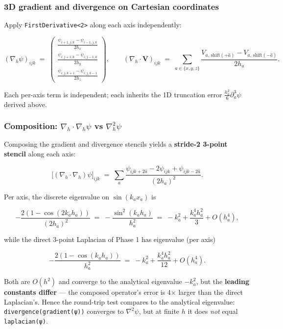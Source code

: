 \subsubsection{3D gradient and divergence on Cartesian
coordinates}\label{d-gradient-and-divergence-on-cartesian-coordinates}

Apply \passthrough{\lstinline!FirstDerivative<2>!} along each axis
independently:

\[
(\nabla_h \psi)_{ijk} \;=\; \begin{pmatrix}
\frac{\psi_{i+1, j, k} - \psi_{i-1, j, k}}{2 h_x} \\[4pt]
\frac{\psi_{i, j+1, k} - \psi_{i, j-1, k}}{2 h_y} \\[4pt]
\frac{\psi_{i, j, k+1} - \psi_{i, j, k-1}}{2 h_z}
\end{pmatrix},
\qquad
(\nabla_h \cdot \mathbf{V})_{ijk} \;=\; \sum_{a \in \{x,y,z\}} \frac{V_{a,\,\text{shift}(+\hat{a})} - V_{a,\,\text{shift}(-\hat{a})}}{2 h_a}.
\]

Each per-axis term is independent; each inherits the 1D truncation error
\(\tfrac{h_a^2}{6} \partial_a^3 \psi\) derived above.

\subsubsection{\texorpdfstring{Composition:
\(\nabla_h \cdot \nabla_h \psi\) vs
\(\nabla^2_h \psi\)}{Composition: \textbackslash nabla\_h \textbackslash cdot \textbackslash nabla\_h \textbackslash psi vs \textbackslash nabla\^{}2\_h \textbackslash psi}}\label{composition-nabla_h-cdot-nabla_h-psi-vs-nabla2_h-psi}

Composing the gradient and divergence stencils yields a \textbf{stride-2
3-point stencil} along each axis:

\[
\bigl[(\nabla_h \cdot \nabla_h)\psi\bigr]_{ijk} \;=\; \sum_a \frac{\psi_{ijk + 2 \hat{a}} - 2\psi_{ijk} + \psi_{ijk - 2 \hat{a}}}{(2 h_a)^2}.
\]

Per axis, the discrete eigenvalue on \(\sin(k_a x_a)\) is

\[
-\frac{2(1 - \cos(2 k_a h_a))}{(2 h_a)^2} \;=\; -\frac{\sin^2(k_a h_a)}{h_a^2} \;=\; -k_a^2 + \frac{k_a^4 h_a^2}{3} + O(h_a^4),
\]

while the direct 3-point Laplacian of Phase 1 has eigenvalue (per axis)

\[
-\frac{2(1 - \cos(k_a h_a))}{h_a^2} \;=\; -k_a^2 + \frac{k_a^4 h_a^2}{12} + O(h_a^4).
\]

Both are \(O(h^2)\) and converge to the analytical eigenvalue
\(-k_a^2\), but the \textbf{leading constants differ} --- the composed
operator's error is 4× larger than the direct Laplacian's. Hence the
round-trip test compares to the analytical eigenvalue:
\passthrough{\lstinline!divergence(gradient(ψ))!} converges to
\(\nabla^2 \psi\), but at finite \(h\) it does \emph{not} equal
\passthrough{\lstinline!laplacian(ψ)!}.

